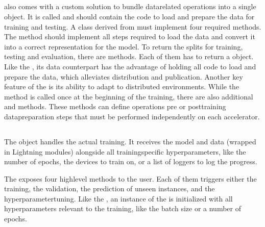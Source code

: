\documentclass[letterpaper,10pt,english]{jupyterBook}
\begin{document}
\subsection{}
\label{\detokenize{PyTorchLightning:lighningdatamodule}}
\sphinxAtStartPar
{} also comes with a custom solution to bundle data\sphinxhyphen{}related operations into a single object.
It is called  and should contain the code to load and prepare the data for training and testing.
A class derived from  must implement four required methods.
The \sphinxhyphen{}method should implement all steps required to load the data and convert it into a correct representation for the model.
To return the splits for training, testing and evaluation, there are \sphinxhyphen{}methods. Each of them has to return a  object.
Like the , its data counterpart has the advantage of holding all code to load and prepare the data, which alleviates distribution and publication.
Another key feature of the  is its ability to adapt to distributed environments.
While the \sphinxhyphen{}method is called once at the beginning of the training, there are also additional \sphinxhyphen{} and \sphinxhyphen{}methods.
These methods can define operations pre\sphinxhyphen{} or post\sphinxhyphen{}training data\sphinxhyphen{}preparation steps that must be performed independently on each accelerator.


\subsection{}
\label{\detokenize{PyTorchLightning:trainer}}
\sphinxAtStartPar
The  object handles the actual training.
It receives the model and data (wrapped in Lightning modules) alongside all training\sphinxhyphen{}specific hyperparameters, like the number of epochs, the devices to train on, or a list of loggers to log the progress.

\sphinxAtStartPar
The  exposes four high\sphinxhyphen{}level methods to the user. Each of them triggers either the training, the validation, the prediction of unseen instances, and the hyperparameter\sphinxhyphen{}tuning.
Like the , an instance of the  is initialized with all hyperparameters relevant to the training, like the batch size or a number of epochs.
\end{document}
